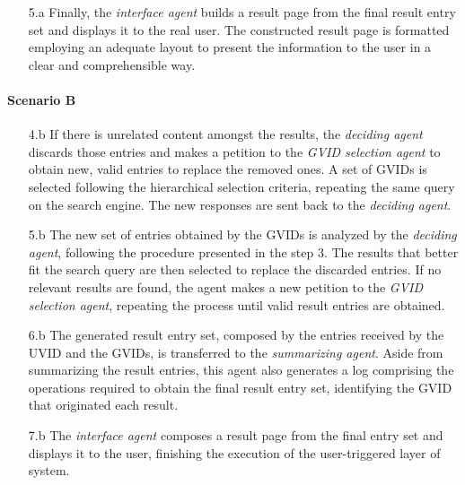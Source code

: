 \begin{enumerate}
\begin{enumerate}
        \item [5.a] Finally, the \textit{interface agent} builds a result page from the final result entry set and displays it to the real user. The constructed result page is formatted employing an adequate layout to present the information to the user in a clear and comprehensible way.
    \end{enumerate}
    
    \paragraph{Scenario B}
    \begin{enumerate}
        \item [4.b] If there is unrelated content amongst the results, the \textit{deciding agent} discards those entries and makes a petition to the \textit{GVID selection agent} to obtain new, valid entries to replace the removed ones. A set of GVIDs is selected following the hierarchical selection criteria, repeating the same query on the search engine. The new responses are sent back to the \textit{deciding agent}.
        
        \item[5.b] The new set of entries obtained by the GVIDs is analyzed by the \textit{deciding agent}, following the procedure presented in the step 3. The results that better fit the search query are then selected to replace the discarded entries. If no relevant results are found, the agent makes a new petition to the \textit{GVID selection agent}, repeating the process until valid result entries are obtained.
        
        \item [6.b] The generated result entry set, composed by the entries received by the UVID and the GVIDs, is transferred to the \textit{summarizing agent}. Aside from summarizing the result entries, this agent also generates a log comprising the operations required to obtain the final result entry set, identifying the GVID that originated each result.
        
        \item [7.b] The \textit{interface agent} composes a result page from the final entry set and displays it to the user, finishing the execution of the user-triggered layer of system.
    \end{enumerate}
\end{enumerate}
\color{black}
